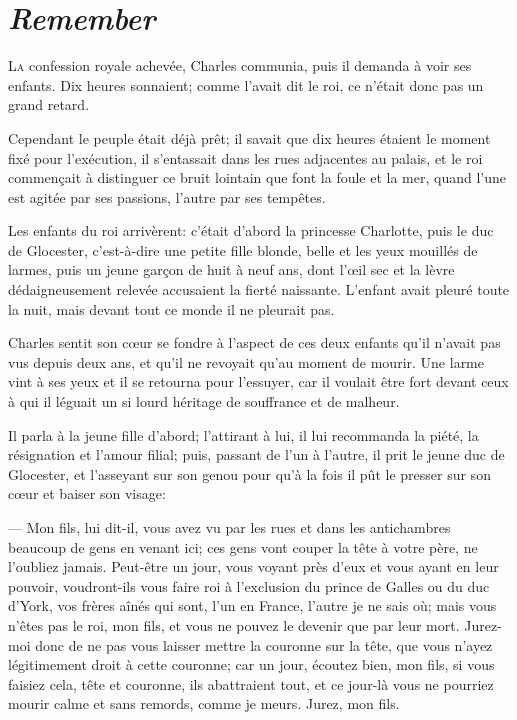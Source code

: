 \chapter{\emph{Remember}}

\lettrine{L}{a} confession royale achevée, Charles communia, puis il demanda à voir ses enfants. Dix heures sonnaient; comme l'avait dit le roi, ce n'était donc pas un grand retard.

\zz
Cependant le peuple était déjà prêt; il savait que dix heures étaient le moment fixé pour l'exécution, il s'entassait dans les rues adjacentes au palais, et le roi commençait à distinguer ce bruit lointain que font la foule et la mer, quand l'une est agitée par ses passions, l'autre par ses tempêtes.

Les enfants du roi arrivèrent: c'était d'abord la princesse Charlotte, puis le duc de Glocester, c'est-à-dire une petite fille blonde, belle et les yeux mouillés de larmes, puis un jeune garçon de huit à neuf ans, dont l'œil sec et la lèvre dédaigneusement relevée accusaient la fierté naissante. L'enfant avait pleuré toute la nuit, mais devant tout ce monde il ne pleurait pas.

Charles sentit son cœur se fondre à l'aspect de ces deux enfants qu'il n'avait pas vus depuis deux ans, et qu'il ne revoyait qu'au moment de mourir. Une larme vint à ses yeux et il se retourna pour l'essuyer, car il voulait être fort devant ceux à qui il léguait un si lourd héritage de souffrance et de malheur.

Il parla à la jeune fille d'abord; l'attirant à lui, il lui recommanda la piété, la résignation et l'amour filial; puis, passant de l'un à l'autre, il prit le jeune duc de Glocester, et l'asseyant sur son genou pour qu'à la fois il pût le presser sur son cœur et baiser son visage:

— Mon fils, lui dit-il, vous avez vu par les rues et dans les antichambres beaucoup de gens en venant ici; ces gens vont couper la tête à votre père, ne l'oubliez jamais. Peut-être un jour, vous voyant près d'eux et vous ayant en leur pouvoir, voudront-ils vous faire roi à l'exclusion du prince de Galles ou du duc d'York, vos frères aînés qui sont, l'un en France, l'autre je ne sais où; mais vous n'êtes pas le roi, mon fils, et vous ne pouvez le devenir que par leur mort. Jurez-moi donc de ne pas vous laisser mettre la couronne sur la tête, que vous n'ayez légitimement droit à cette couronne; car un jour, écoutez bien, mon fils, si vous faisiez cela, tête et couronne, ils abattraient tout, et ce jour-là vous ne pourriez mourir calme et sans remords, comme je meurs. Jurez, mon fils.

